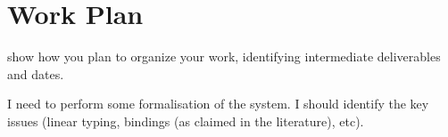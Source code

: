 \documentclass{mprop}
\begin{document}
\section{Work Plan}

show how you plan to organize your work, identifying intermediate deliverables
and dates.

I need to perform some formalisation of the system. I should identify the key
issues (linear typing, bindings (as claimed in the literature), etc).


\printbibliography
\end{document}
